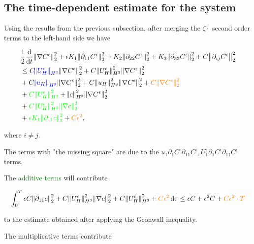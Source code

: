 \documentclass[11pt]{article}
\newcommand*\diff{\mathop{}\!\mathrm{d}}
\begin{document}
    
\subsection{The time-dependent estimate for the system}

Using the results from the previous subsection, after merging the $\zeta \cdot$ second order terms to the left-hand side we have 

\begin{equation}
  \begin{split}
    & \frac{1}{2} \frac{\diff}{\diff t} \norm{\nabla C^\epsilon}_2^2 + \epsilon K_1 \norm{\partial_{11} C^\epsilon}_2^2 + K_2 \norm{\partial_{22} C^\epsilon}_2^2 + K_3 \norm{\partial_{33} C^\epsilon}_2^2 + C \norm{\partial_{ij} C^\epsilon}_2^2 \\
    & \leq C \textcolor{blue}{\norm{U_H^\epsilon}_{H^3}} \norm{\nabla C^\epsilon}_2^2 + C \norm{U_H^\epsilon}_{H^3}^2 \norm{\nabla C^\epsilon}_2^2 \\
    & + C \textcolor{blue}{\norm{u_H}_{H^3}} \norm{\nabla C^\epsilon}_2^2 + C \norm{u_H}_{H^3}^2 \norm{\nabla C^\epsilon}_2^2 + \textcolor{orange}{C \norm{\nabla C^\epsilon}_2^2} \\
    & + \textcolor{green}{C \norm{U_H^\epsilon}_{H^3}^2} + \norm{c}_{H^2}^2 \norm{\nabla C^\epsilon}_2^2 \\
    & + \textcolor{green}{C \norm{U_H^\epsilon}_{H^3}^2 \norm{\nabla c}_2^2} \\
    & + \textcolor{green}{\epsilon K_1 \norm{\partial_{11} c}_2^2} + \textcolor{orange}{C \epsilon^2},
  \end{split}
\end{equation}

where $i \neq j.$

The terms with "the missing square" are due to the $u_1 \partial_1 C^\epsilon \partial_{11} C^\epsilon, U_1^\epsilon \partial_1 C^\epsilon \partial_{11} C^\epsilon$ terms.

The \textcolor{green}{additive terms} will contribute

\[ \int_0^T \epsilon C \norm{\partial_{11} c}_2^2 + C \norm{U_H^\epsilon}_{H^3}^2 \norm{\nabla c}_2^2 + C \norm{U_H^\epsilon}_{H^3}^2 + \textcolor{orange}{C \epsilon^2} \diff \tau \leq \epsilon C + \epsilon^2 C + \textcolor{orange}{C \epsilon^2 \cdot T}\]

to the estimate obtained after applying the Gronwall inequality.

The multiplicative terms contribute
\end{document}
